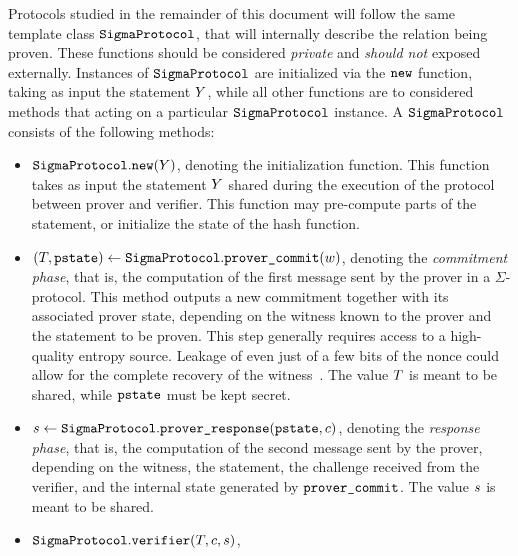 \documentclass[11pt]{article}
\begin{document}
Protocols studied in the remainder of this document will follow the same template class $\texttt{SigmaProtocol}$, that will internally describe the relation being proven. These functions should be considered \emph{private} and \emph{should not} exposed externally.
Instances of $\texttt{SigmaProtocol}$ are initialized via the $\texttt{new}$ function, taking as input the statement $Y$, while all other functions are to considered methods that acting on a particular $\texttt{SigmaProtocol}$ instance.
A $\texttt{SigmaProtocol}$ consists of the following methods:
      \begin{itemize}
        \item $\texttt{SigmaProtocol}.\texttt{new}(Y)$,
        denoting the initialization function. This function takes as input the statement $Y$ shared during the execution of the protocol between prover and verifier.
        This function may pre-compute parts of the statement, or initialize the state of the hash function.
        \item
          $(T, \texttt{pstate})\gets \texttt{SigmaProtocol}.\texttt{prover\_commit}(w)$,
          denoting the \emph{commitment phase}, that is, the computation of the first message sent by the prover in a $\Sigma$-protocol. This method outputs a new commitment together with its associated prover state, depending on the witness known to the prover and the statement to be proven.
          This step generally requires access to a high-quality entropy source.
          Leakage of even just of a few bits of the nonce could allow for the complete recovery of the witness~\cite{lattice-attack,bleichenbacher,CCS:ANTTY20}.
					The value $T$ is meant to be shared, while $\texttt{pstate}$ must be kept secret.
        \item
          $s \gets \texttt{SigmaProtocol}.\texttt{prover\_response}(\texttt{pstate}, c)$,
          denoting the \emph{response phase}, that is, the computation of the second message sent by the prover, depending on the witness, the statement, the challenge received from the verifier, and the internal state generated by $\texttt{prover\_commit}$.
          The value $s$ is meant to be shared.
        \item $\texttt{SigmaProtocol}.\texttt{verifier}(T, c, s)$,

\end{itemize}
\end{document}
